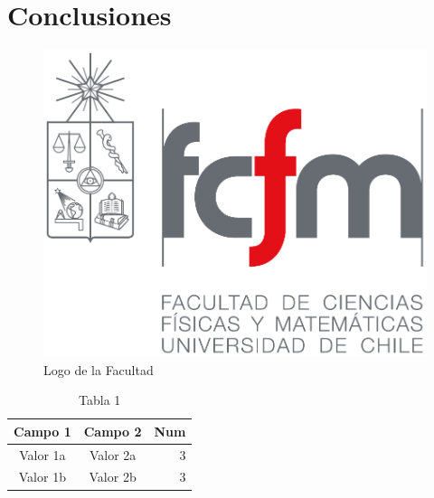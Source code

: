 \chapter{Conclusiones}

\lipsum[130-132]
\begin{figure}
	\centering
	\includegraphics[scale=.2]{imagenes/fcfm.pdf}
	\caption{Logo de la Facultad}
	\label{logofcfm}
\end{figure}

\lipsum[133-134]

\begin{table}
	\centering
	\caption{Tabla 1}
	\label{tabla:1}
	\begin{tabular}{|c|c|r|}
		\hline
		\textbf{Campo 1} & \textbf{Campo 2} & \textbf{Num} \\\hline
		Valor 1a & Valor 2a & 3\\
		Valor 1b & Valor 2b & 3\\
		\hline
	\end{tabular}

\end{table}
\lipsum[135]